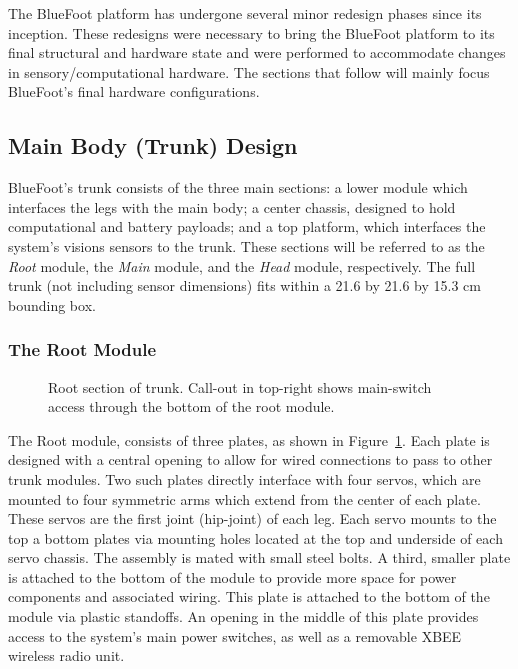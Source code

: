 		The BlueFoot platform has undergone several minor redesign phases since its inception. These redesigns were necessary to bring the BlueFoot platform to its final structural and hardware state and were performed to accommodate changes in  sensory/computational hardware. The sections that follow will mainly focus BlueFoot's final hardware configurations.

		\subsection{Main Body (Trunk) Design}
		
			BlueFoot's trunk consists of the three main sections: a lower module which interfaces the legs with the main body; a center chassis, designed to  hold computational and battery payloads; and a top platform, which interfaces the system's visions sensors to the trunk. These sections will be referred to as the \emph{Root} module, the \emph{Main} module, and the \emph{Head} module, respectively. The full trunk (not including sensor dimensions) fits within a 21.6 by 21.6 by 15.3 cm bounding box. 

			\subsubsection{The Root Module}

				\begin{figure}[h!]
					\centering
					\caption{Root section of trunk. Call-out in top-right shows main-switch access through the bottom of the root module.}
					\label{fig::root_module}
				\end{figure}

				The Root module, consists of three plates, as shown in Figure~\ref{fig::root_module}. Each plate is designed with a central opening to allow for wired connections to pass to other trunk modules. Two such plates directly interface with four servos, which are mounted to four symmetric arms which extend from the center of each plate. These servos are the first joint (hip-joint) of each leg. Each servo mounts to the top a bottom plates via mounting holes located at the top and underside of each servo chassis. The assembly is mated with small steel bolts. A third, smaller plate is attached to the bottom of the module to provide more space for power components and associated wiring. This plate is attached to the bottom of the module via plastic standoffs. An opening in the middle of this plate provides access to the system's main power switches, as well as a removable XBEE wireless radio unit.

